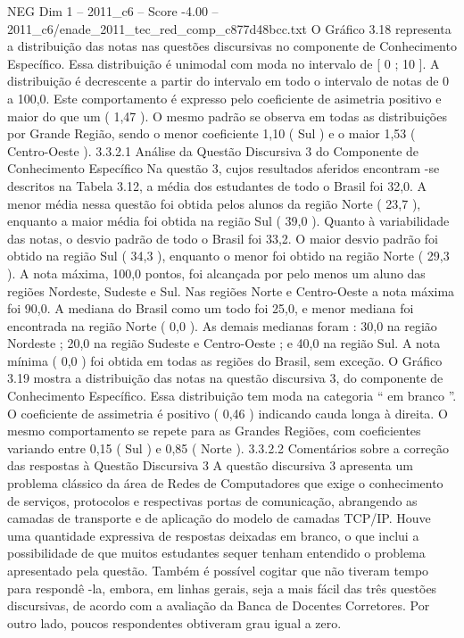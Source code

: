\begin{textsample}{NEG Dim 1 – 2011\_c6 – Score -4.00 – 2011\_c6/enade\_2011\_tec\_red\_comp\_c877d48bcc.txt}
O Gráfico 3.18 representa a distribuição das notas nas questões discursivas no componente de Conhecimento Específico.
Essa distribuição é unimodal com moda no intervalo de [ 0 ; 10 ].
A distribuição é decrescente a partir do intervalo em todo o intervalo de notas de 0 a 100,0.
Este comportamento é expresso pelo coeficiente de asimetria positivo e maior do que um ( 1,47 ).
O mesmo padrão se observa em todas as distribuições por Grande Região, sendo o menor coeficiente 1,10 ( Sul ) e o maior 1,53 ( Centro-Oeste ). 3.3.2.1 Análise da Questão Discursiva 3 do Componente de Conhecimento Específico Na questão 3, cujos resultados aferidos encontram -se descritos na Tabela 3.12, a média dos estudantes de todo o Brasil foi 32,0.
A menor média nessa questão foi obtida pelos alunos da região Norte ( 23,7 ), enquanto a maior média foi obtida na região Sul ( 39,0 ).
Quanto à variabilidade das notas, o desvio padrão de todo o Brasil foi 33,2.
O maior desvio padrão foi obtido na região Sul ( 34,3 ), enquanto o menor foi obtido na região Norte ( 29,3 ).
A nota máxima, 100,0 pontos, foi alcançada por pelo menos um aluno das regiões Nordeste, Sudeste e Sul.
Nas regiões Norte e Centro-Oeste a nota máxima foi 90,0.
A mediana do Brasil como um todo foi 25,0, e menor mediana foi encontrada na região Norte ( 0,0 ).
As demais medianas foram : 30,0 na região Nordeste ; 20,0 na região Sudeste e Centro-Oeste ; e 40,0 na região Sul.
A nota mínima ( 0,0 ) foi obtida em todas as regiões do Brasil, sem exceção.
O Gráfico 3.19 mostra a distribuição das notas na questão discursiva 3, do componente de Conhecimento Específico.
Essa distribuição tem moda na categoria “ em branco ”.
O coeficiente de assimetria é positivo ( 0,46 ) indicando cauda longa à direita.
O mesmo comportamento se repete para as Grandes Regiões, com coeficientes variando entre 0,15 ( Sul ) e 0,85 ( Norte ). 3.3.2.2 Comentários sobre a correção das respostas à Questão Discursiva 3 A questão discursiva 3 apresenta um problema clássico da área de Redes de Computadores que exige o conhecimento de serviços, protocolos e respectivas portas de comunicação, abrangendo as camadas de transporte e de aplicação do modelo de camadas TCP/IP.
Houve uma quantidade expressiva de respostas deixadas em branco, o que inclui a possibilidade de que muitos estudantes sequer tenham entendido o problema apresentado pela questão.
Também é possível cogitar que não tiveram tempo para respondê -la, embora, em linhas gerais, seja a mais fácil das três questões discursivas, de acordo com a avaliação da Banca de Docentes Corretores.
Por outro lado, poucos respondentes obtiveram grau igual a zero.

\end{textsample}
